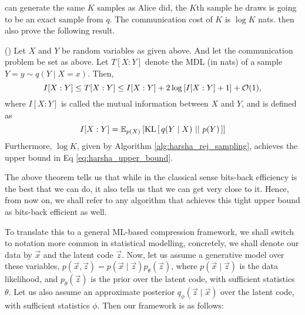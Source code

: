 can generate the same $K$ samples as Alice did, the $K$th sample he draws is
going to be an exact sample from $q$. The communication cost of $K$ is
$\log K$ nats. \cite{harsha2007communication} then also prove the following result.
\begin{theorem}{(\cite{harsha2007communication})}
  \label{thm:bits-back_efficiency}
Let $X$ and $Y$ be random variables as given above. And let the communication
problem be set as above. Let $T[X : Y]$ denote the MDL (in nats) of a sample
$Y=y \sim q(Y \mid X=x)$. Then,
\begin{equation}
\label{eq:harsha_upper_bound}
  I[X : Y] \leq T[X : Y] \leq I[X : Y] + 2\log \left[ I[X : Y] + 1 \right] + \Oh(1),
\end{equation}
where $I[ X : Y ]$ is called the mutual information between $X$ and $Y$, and is
defined as
\[
  I[ X : Y ] = \Exp{\KL{q(Y \mid X)}{p(Y)}}{p(X)}
\]
Furthermore, $\log K$, given by Algorithm \ref{alg:harsha_rej_sampling},
achieves the upper bound in Eq \ref{eq:harsha_upper_bound}.
\end{theorem}
\par
The above theorem tells us that while in the classical sense bits-back efficiency
is the best that we can do, it also tells us that we can get very close to it.
Hence, from now on, we shall refer to any algorithm that achieves this tight
upper bound as bits-back efficient as well.
\par
To translate this to a general ML-based compression framework, we shall switch
to notation more common in statistical modelling, concretely, we shall denote
our data by $\vec{x}$ and the latent code $\vec{z}$. Now, let us assume a
generative model over these variables, $p(\vec{x}, \vec{z}) = p(\vec{x} \mid
\vec{z})p_\theta(\vec{z})$, where $p(\vec{x} \mid \vec{z})$ is the data likelihood, and
$p_\theta(\vec{z})$ is the prior over the latent code, with sufficient
statistics $\theta$. Let us also assume an approximate posterior $q_\phi(\vec{z}
\mid \vec{x})$ over the latent code, with sufficient statistics $\phi$. Then our
framework is as follows:
